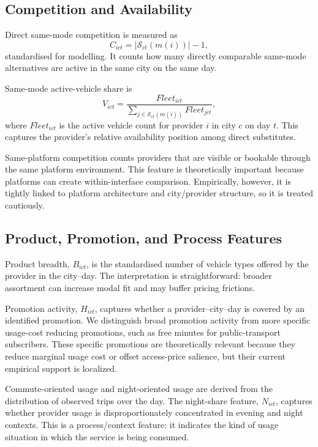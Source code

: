 \documentclass[11pt]{article}
\begin{document}
\subsection{Competition and Availability}

Direct same-mode competition is measured as
\[
C_{ict}=\left|\mathcal{S}_{ct}(m(i))\right|-1,
\]
standardised for modelling. It counts how many directly comparable same-mode alternatives
are active in the same city on the same day.

Same-mode active-vehicle share is
\[
V_{ict}=\frac{Fleet_{ict}}{\sum_{j\in \mathcal{S}_{ct}(m(i))} Fleet_{jct}},
\]
where $Fleet_{ict}$ is the active vehicle count for provider $i$ in city $c$ on day $t$.
This captures the provider's relative availability position among direct substitutes.

Same-platform competition counts providers that are visible or bookable through the same
platform environment. This feature is theoretically important because platforms can create
within-interface comparison. Empirically, however, it is tightly linked to platform
architecture and city/provider structure, so it is treated cautiously.

\subsection{Product, Promotion, and Process Features}

Product breadth, $B_{ict}$, is the standardised number of vehicle types offered by the
provider in the city--day. The interpretation is straightforward: broader assortment can
increase modal fit and may buffer pricing frictions.

Promotion activity, $H_{ict}$, captures whether a provider--city--day is covered by an
identified promotion. We distinguish broad promotion activity from more specific usage-cost
reducing promotions, such as free minutes for public-transport subscribers. These specific
promotions are theoretically relevant because they reduce marginal usage cost or offset
access-price salience, but their current empirical support is localized.

Commute-oriented usage and night-oriented usage are derived from the distribution of observed
trips over the day. The night-share feature, $N_{ict}$, captures whether provider usage is
disproportionately concentrated in evening and night contexts. This is a process/context
feature: it indicates the kind of usage situation in which the service is being consumed.
\end{document}
